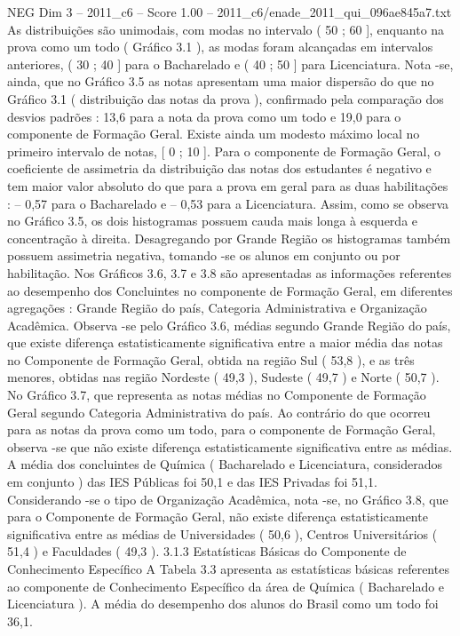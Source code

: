 \begin{textsample}{NEG Dim 3 – 2011\_c6 – Score 1.00 – 2011\_c6/enade\_2011\_qui\_096ae845a7.txt}
As distribuições são unimodais, com modas no intervalo ( 50 ; 60 ], enquanto na prova como um todo ( Gráfico 3.1 ), as modas foram alcançadas em intervalos anteriores, ( 30 ; 40 ] para o Bacharelado e ( 40 ; 50 ] para Licenciatura.
Nota -se, ainda, que no Gráfico 3.5 as notas apresentam uma maior dispersão do que no Gráfico 3.1 ( distribuição das notas da prova ), confirmado pela comparação dos desvios padrões : 13,6 para a nota da prova como um todo e 19,0 para o componente de Formação Geral.
Existe ainda um modesto máximo local no primeiro intervalo de notas, [ 0 ; 10 ].
Para o componente de Formação Geral, o coeficiente de assimetria da distribuição das notas dos estudantes é negativo e tem maior valor absoluto do que para a prova em geral para as duas habilitações : – 0,57 para o Bacharelado e – 0,53 para a Licenciatura.
Assim, como se observa no Gráfico 3.5, os dois histogramas possuem cauda mais longa à esquerda e concentração à direita.
Desagregando por Grande Região os histogramas também possuem assimetria negativa, tomando -se os alunos em conjunto ou por habilitação.
Nos Gráficos 3.6, 3.7 e 3.8 são apresentadas as informações referentes ao desempenho dos Concluintes no componente de Formação Geral, em diferentes agregações : Grande Região do país, Categoria Administrativa e Organização Acadêmica.
Observa -se pelo Gráfico 3.6, médias segundo Grande Região do país, que existe diferença estatisticamente significativa entre a maior média das notas no Componente de Formação Geral, obtida na região Sul ( 53,8 ), e as três menores, obtidas nas região Nordeste ( 49,3 ), Sudeste ( 49,7 ) e Norte ( 50,7 ).
No Gráfico 3.7, que representa as notas médias no Componente de Formação Geral segundo Categoria Administrativa do país.
Ao contrário do que ocorreu para as notas da prova como um todo, para o componente de Formação Geral, observa -se que não existe diferença estatisticamente significativa entre as médias.
A média dos concluintes de Química ( Bacharelado e Licenciatura, considerados em conjunto ) das IES Públicas foi 50,1 e das IES Privadas foi 51,1.
Considerando -se o tipo de Organização Acadêmica, nota -se, no Gráfico 3.8, que para o Componente de Formação Geral, não existe diferença estatisticamente significativa entre as médias de Universidades ( 50,6 ), Centros Universitários ( 51,4 ) e Faculdades ( 49,3 ). 3.1.3 Estatísticas Básicas do Componente de Conhecimento Específico A Tabela 3.3 apresenta as estatísticas básicas referentes ao componente de Conhecimento Específico da área de Química ( Bacharelado e Licenciatura ).
A média do desempenho dos alunos do Brasil como um todo foi 36,1.

\end{textsample}
